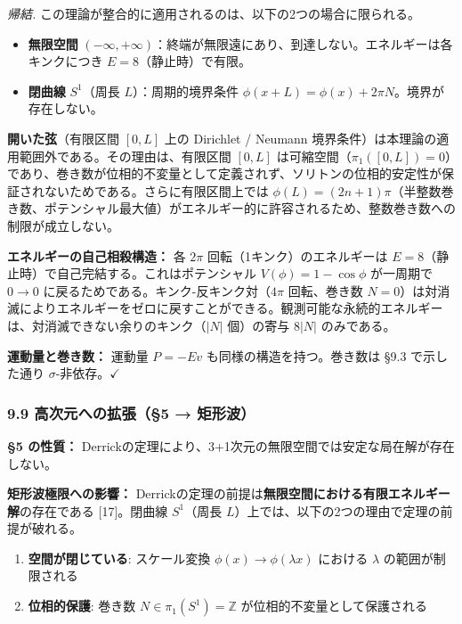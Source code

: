 \documentclass[a4paper,11pt]{ltjsarticle}
\providecommand{\tightlist}{\setlength{\itemsep}{0pt}\setlength{\parskip}{0pt}}
\begin{document}
\emph{帰結.}
この理論が整合的に適用されるのは、以下の2つの場合に限られる。

\begin{itemize}
\tightlist
\item
  \textbf{無限空間}
  \((-\infty, +\infty)\)：終端が無限遠にあり、到達しない。エネルギーは各キンクにつき
  \(E = 8\)（静止時）で有限。
\item
  \textbf{閉曲線} \(S^1\)（周長 \(L\)）：周期的境界条件
  \(\phi(x+L) = \phi(x) + 2\pi N\)。境界が存在しない。
\end{itemize}

\textbf{開いた弦}（有限区間 \([0, L]\) 上の Dirichlet / Neumann
境界条件）は本理論の適用範囲外である。その理由は、有限区間 \([0, L]\)
は可縮空間（\(\pi_1([0,L]) = 0\)）であり、巻き数が位相的不変量として定義されず、ソリトンの位相的安定性が保証されないためである。さらに有限区間上では
\(\phi(L) = (2n+1)\pi\)（半整数巻き数、ポテンシャル最大値）がエネルギー的に許容されるため、整数巻き数への制限が成立しない。

\textbf{エネルギーの自己相殺構造：} 各 \(2\pi\)
回転（1キンク）のエネルギーは
\(E = 8\)（静止時）で自己完結する。これはポテンシャル
\(V(\phi) = 1-\cos\phi\) が一周期で \(0 \to 0\)
に戻るためである。キンク-反キンク対（\(4\pi\) 回転、巻き数
\(N = 0\)）は対消滅によりエネルギーをゼロに戻すことができる。観測可能な永続的エネルギーは、対消滅できない余りのキンク（\(|N|\)
個）の寄与 \(8|N|\) のみである。

\textbf{運動量と巻き数：} 運動量 \(P = -Ev\)
も同様の構造を持つ。巻き数は §9.3 で示した通り
\(\sigma\)-非依存。\(\checkmark\)

\subsubsection{9.9 高次元への拡張（§5 →
矩形波）}\label{ux9ad8ux6b21ux5143ux3078ux306eux62e1ux5f355-ux77e9ux5f62ux6ce2}

\textbf{§5 の性質：}
Derrickの定理により、3+1次元の無限空間では安定な局在解が存在しない。

\textbf{矩形波極限への影響：}
Derrickの定理の前提は\textbf{無限空間における有限エネルギー解}の存在である
{[}17{]}。閉曲線 \(S^1\)（周長
\(L\)）上では、以下の2つの理由で定理の前提が破れる。

\begin{enumerate}
\def\labelenumi{\arabic{enumi}.}
\tightlist
\item
  \textbf{空間が閉じている}: スケール変換
  \(\phi(x) \to \phi(\lambda x)\) における \(\lambda\)
  の範囲が制限される
\item
  \textbf{位相的保護}: 巻き数 \(N \in \pi_1(S^1) = \mathbb{Z}\)
  が位相的不変量として保護される
\end{enumerate}
\end{document}
